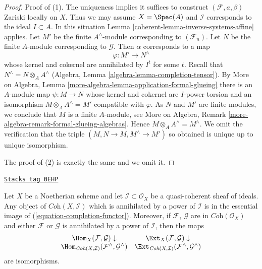 \begin{proof}

Proof of (1). The uniqueness implies it suffices to construct
$(\mathcal{F}, a, \beta)$
Zariski locally on $X$. Thus we may assume $X = \Spec(A)$ and $\mathcal{I}$
corresponds to the ideal $I \subset A$. In this situation
Lemma \ref{coherent-lemma-inverse-systems-affine} applies.
Let $M'$ be the finite $A^\wedge$-module corresponding
to $(\mathcal{F}_n)$. Let $N$ be the finite $A$-module corresponding to
$\mathcal{G}$. Then $\alpha$ corresponds to a map
$$
\varphi : M' \longrightarrow N^\wedge
$$
whose kernel and cokernel are annihilated by $I^t$ for some $t$. Recall that
$N^\wedge = N \otimes_A A^\wedge$
(Algebra, Lemma \ref{algebra-lemma-completion-tensor}).
By More on Algebra, Lemma \ref{more-algebra-lemma-application-formal-glueing}
there is an $A$-module map $\psi : M \to N$ whose kernel and cokernel are
$I$-power torsion and an isomorphism
$M \otimes_A A^\wedge = M'$ compatible with $\varphi$.
As $N$ and $M'$ are finite modules, we conclude that $M$
is a finite $A$-module, see
More on Algebra, Remark \ref{more-algebra-remark-formal-glueing-algebras}.
Hence $M \otimes_A A^\wedge = M^\wedge$. We omit the verification
that the triple $(M, N \to M, M^\wedge \to M')$ so obtained
is unique up to unique isomorphism.

\medskip\noindent
The proof of (2) is exactly the same and we omit it.
\end{proof}

\begin{lemma}
\label{coherent-lemma-torsion-hom-ext}
\href{https://stacks.math.columbia.edu/tag/0EHP}{\texttt{Stacks tag 0EHP}}

Let $X$ be a Noetherian scheme and let $\mathcal{I} \subset \mathcal{O}_X$
be a quasi-coherent sheaf of ideals. Any object of
$\textit{Coh}(X, \mathcal{I})$ which is annihilated
by a power of $\mathcal{I}$ is in the essential image of
(\ref{equation-completion-functor}).
Moreover, if $\mathcal{F}$, $\mathcal{G}$ are in $\textit{Coh}(\mathcal{O}_X)$
and either $\mathcal{F}$ or $\mathcal{G}$ is annihilated by a power of
$\mathcal{I}$, then the maps
$$
\begin{array}{cc}\Hom_X(\mathcal{F}, \mathcal{G}) \downarrow & \Ext_X(\mathcal{F}, \mathcal{G}) \downarrow \\ \Hom_{\textit{Coh}(X, \mathcal{I})}(\mathcal{F}^\wedge, \mathcal{G}^\wedge) & \Ext_{\textit{Coh}(X, \mathcal{I})}(\mathcal{F}^\wedge, \mathcal{G}^\wedge)\end{array}
$$
are isomorphisms.
\end{lemma}

